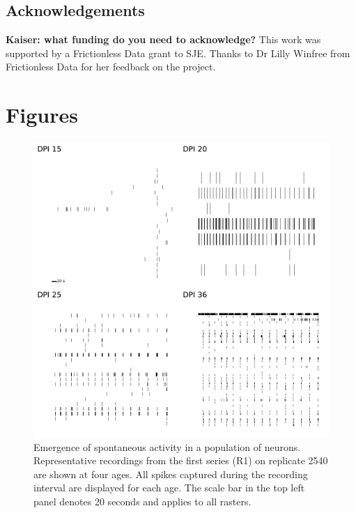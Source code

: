 \documentclass[doublespacing]{bmcart}
\begin{document}
\begin{backmatter}

\subsection*{Acknowledgements}


\textbf{Kaiser: what funding do you need to acknowledge?}  This work was supported by a Frictionless Data grant to SJE\@.  Thanks
to Dr Lilly Winfree from Frictionless Data for her feedback on the
project.





\clearpage
\section*{Figures}
\begin{figure}[h!]
  \includegraphics{../plots/supplementary_figures/raster_plots.pdf}
  \caption{Emergence of spontaneous activity in a population of neurons. Representative recordings from the first series (R1) on replicate 2540 are shown at four ages. All spikes captured during the recording interval are displayed for each age.  The scale bar in the top left panel denotes 20 seconds and applies to all rasters.}
  \label{fig:rasters}
\end{figure}


\end{backmatter}
\end{document}
